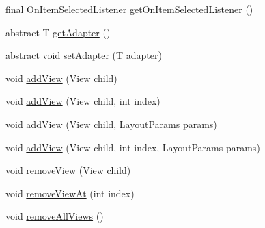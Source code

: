 \begin{DoxyCompactItemize}
\item 
final On\-Item\-Selected\-Listener \hyperlink{classcom_1_1zia_1_1freshdocs_1_1widget_1_1fileexplorer_1_1carousel_1_1_carousel_adapter_3_01_t_01extends_01_adapter_01_4_a6706cc2c83bf88fa5d01f655b4b27380}{get\-On\-Item\-Selected\-Listener} ()
\item 
abstract T \hyperlink{classcom_1_1zia_1_1freshdocs_1_1widget_1_1fileexplorer_1_1carousel_1_1_carousel_adapter_3_01_t_01extends_01_adapter_01_4_a0c8b9afdcca29289938a6c22daae471c}{get\-Adapter} ()
\item 
abstract void \hyperlink{classcom_1_1zia_1_1freshdocs_1_1widget_1_1fileexplorer_1_1carousel_1_1_carousel_adapter_3_01_t_01extends_01_adapter_01_4_acbaed6d27a4d3165a754c05dcf43a2b6}{set\-Adapter} (T adapter)
\item 
void \hyperlink{classcom_1_1zia_1_1freshdocs_1_1widget_1_1fileexplorer_1_1carousel_1_1_carousel_adapter_3_01_t_01extends_01_adapter_01_4_a06a80af314f64247e74844cde16f4c9c}{add\-View} (View child)
\item 
void \hyperlink{classcom_1_1zia_1_1freshdocs_1_1widget_1_1fileexplorer_1_1carousel_1_1_carousel_adapter_3_01_t_01extends_01_adapter_01_4_a6d18d3fd54941464a729ee9edfaeaa02}{add\-View} (View child, int index)
\item 
void \hyperlink{classcom_1_1zia_1_1freshdocs_1_1widget_1_1fileexplorer_1_1carousel_1_1_carousel_adapter_3_01_t_01extends_01_adapter_01_4_a74715e8d49a54d8b45ccef561ee4520e}{add\-View} (View child, Layout\-Params params)
\item 
void \hyperlink{classcom_1_1zia_1_1freshdocs_1_1widget_1_1fileexplorer_1_1carousel_1_1_carousel_adapter_3_01_t_01extends_01_adapter_01_4_ad4664a92c8abecf98b28fa189de437a2}{add\-View} (View child, int index, Layout\-Params params)
\item 
void \hyperlink{classcom_1_1zia_1_1freshdocs_1_1widget_1_1fileexplorer_1_1carousel_1_1_carousel_adapter_3_01_t_01extends_01_adapter_01_4_a1d991f487fa3014ba0970005b0417d36}{remove\-View} (View child)
\item 
void \hyperlink{classcom_1_1zia_1_1freshdocs_1_1widget_1_1fileexplorer_1_1carousel_1_1_carousel_adapter_3_01_t_01extends_01_adapter_01_4_a461c9cbb332f5e1325182427f82543f7}{remove\-View\-At} (int index)
\item 
void \hyperlink{classcom_1_1zia_1_1freshdocs_1_1widget_1_1fileexplorer_1_1carousel_1_1_carousel_adapter_3_01_t_01extends_01_adapter_01_4_a84946bfc0c18dd530ea1858c54b74e46}{remove\-All\-Views} ()
\item 

\end{DoxyCompactItemize}
